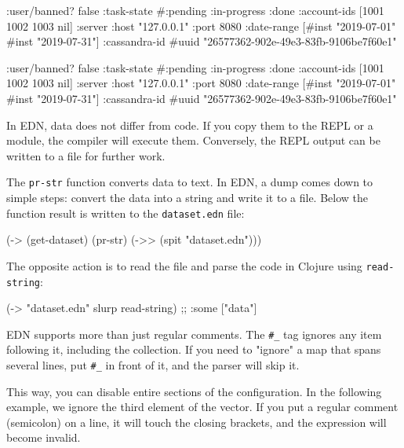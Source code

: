 \begin{clojure}
{:user/banned? false
 :task-state
 #{:pending :in-progress :done}
 :account-ids
 [1001 1002 1003 nil]
 :server
 {:host "127.0.0.1" :port 8080}
 :date-range
 [#inst "2019-07-01" #inst "2019-07-31"]
 :cassandra-id #uuid
 "26577362-902e-49e3-83fb-9106be7f60e1"}
\end{clojure}

\else

\begin{clojure}
{:user/banned? false
 :task-state #{:pending :in-progress :done}
 :account-ids [1001 1002 1003 nil]
 :server {:host "127.0.0.1" :port 8080}
 :date-range [#inst "2019-07-01" #inst "2019-07-31"]
 :cassandra-id #uuid "26577362-902e-49e3-83fb-9106be7f60e1"}
\end{clojure}

\fi

In EDN, data does not differ from code. If you copy them to the REPL or a module, the compiler will execute them. Conversely, the REPL output can be written to a file for further work.

The \verb|pr-str| function converts data to text. In EDN, a dump comes down to simple steps: convert the data into a string and write it to a file. Below the function result is written to the \verb|dataset.edn| file:

\begin{clojure}
(-> (get-dataset)
    (pr-str)
    (->> (spit "dataset.edn")))
\end{clojure}

The opposite action is to read the file and parse the code in Clojure using \verb|read-string|:

\begin{clojure}
(-> "dataset.edn" slurp read-string)
;; {:some ["data"]}
\end{clojure}


EDN supports more than just regular comments. The \verb|#_| tag ignores any item following it, including the collection. If you need to "ignore" a map that spans several lines, put \verb|#_| in front of it, and the parser will skip it.


This way, you can disable entire sections of the configuration. In the following example, we ignore the third element of the vector. If you put a regular comment (semicolon) on a line, it will touch the closing brackets, and the expression will become invalid.

